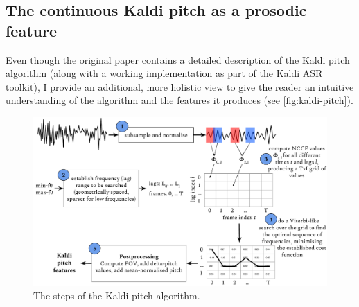 \documentclass[bsc,frontabs,twoside,singlespacing,parskip,deptreport]{infthesis}
\begin{document}
{{    \subsection{The continuous Kaldi pitch as a prosodic feature}{
      \label{sec:kaldi-pitch}
      Even though the original paper \citep{Ghahremani_et_al_2014} contains a detailed description of the Kaldi pitch algorithm (along with a working implementation as part of the Kaldi ASR toolkit), I provide an additional, more holistic view to give the reader an intuitive understanding of the algorithm and the features it produces (see \autoref{fig:kaldi-pitch}).
      \begin{figure}[h!]
        \centering
        \includegraphics[width=\textwidth]{graphics/kaldi-pitch}
        \vspace*{-1em}
        \caption{The steps of the Kaldi pitch algorithm.}
        \label{fig:kaldi-pitch}
      \end{figure}
}}}
\end{document}
